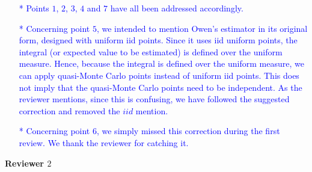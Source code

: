 \documentclass[10pt,a4paper]{article}
\begin{document}
\textcolor{blue}{
\begin{itemize}
\item[*]Points $1$, $2$, $3$, $4$ and $7$ have all been addressed accordingly.
\item[*]Concerning point $5$, we intended to mention Owen's estimator in its original form, designed with uniform iid points. Since it uses iid uniform points, the integral (or expected value to be estimated) is defined over the uniform measure. Hence, because the integral is defined over the uniform measure, we can apply quasi-Monte Carlo points instead of uniform iid points. This does not imply that the quasi-Monte Carlo points need to be independent. As the reviewer mentions, since this is confusing, we have followed the suggested correction and removed the $iid$ mention.
\item[*]Concerning point $6$, we simply missed this correction during the first review. We thank the reviewer for catching it.\\
\end{itemize}}

\textbf{\large{Reviewer $2$}}
\vspace*{0.5cm}
\end{document}

